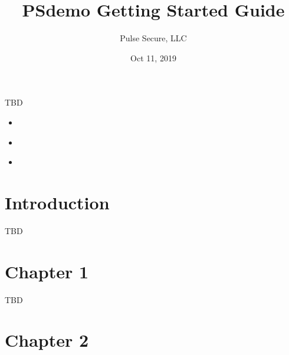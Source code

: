 \documentclass[letterpaper,10pt,english]{sphinxmanual}
\title{PSdemo Getting Started Guide}
\date{Oct 11, 2019}
\author{Pulse Secure, LLC}
\begin{document}
\pagestyle{empty}
\sphinxmaketitle
\pagestyle{plain}
\sphinxtableofcontents
\pagestyle{normal}
\label{\detokenize{get-started::doc}}


TBD

\begin{sphinxShadowBox}
\begin{itemize}
\item {} 
\label{\detokenize{get-started:id1}}{\hyperref[\detokenize{get-started:introduction}]{}}

\item {} 
\label{\detokenize{get-started:id2}}{\hyperref[\detokenize{get-started:chapter-1}]{}}

\item {} 
\label{\detokenize{get-started:id3}}{\hyperref[\detokenize{get-started:chapter-2}]{}}

\end{itemize}
\end{sphinxShadowBox}


\chapter{Introduction}
\label{\detokenize{get-started:introduction}}
TBD


\chapter{Chapter 1}
\label{\detokenize{get-started:chapter-1}}
TBD


\chapter{Chapter 2}
\label{\detokenize{get-started:chapter-2}}


\renewcommand{\indexname}{Index}
\printindex
\end{document}
